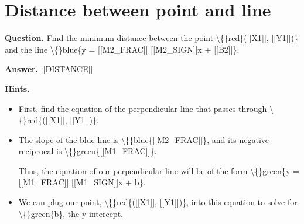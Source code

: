 \documentclass{article}
\begin{document}
\section*{Distance between point and line}
\textbf{Question.} Find the minimum distance between the point \textbackslash\{\}red\{([[X1]], [[Y1]])\}
                        and the line \textbackslash\{\}blue\{y =
                        [[M2\_FRAC]]
                        [[M2\_SIGN]]x
                        + [[B2]]\}.

\textbf{Answer.} [[DISTANCE]]

\textbf{Hints.}
\begin{itemize}
  \item First, find the equation of the perpendicular line that passes through \textbackslash\{\}red\{([[X1]], [[Y1]])\}.
  \item The slope of the blue line is \textbackslash\{\}blue\{[[M2\_FRAC]]\},
                            and its negative reciprocal is \textbackslash\{\}green\{[[M1\_FRAC]]\}.
                        
                        
                            Thus, the equation of our perpendicular line will be of the form \textbackslash\{\}green\{y =
                            [[M1\_FRAC]]
                            [[M1\_SIGN]]x + b\}.
  \item We can plug our point, \textbackslash\{\}red\{([[X1]], [[Y1]])\},
                            into this equation to solve for \textbackslash\{\}green\{b\}, the y-intercept.
                        

\end{itemize}
\end{document}
